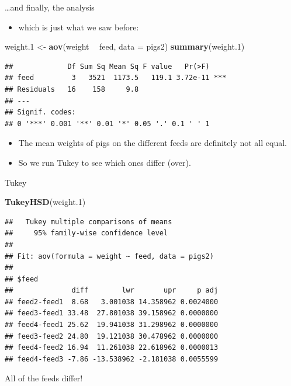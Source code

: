 \documentclass[ignorenonframetext,]{beamer}
\newenvironment{Shaded}{\begin{snugshade}}{\end{snugshade}}
\newcommand{\DataTypeTok}[1]{\textcolor[rgb]{0.13,0.29,0.53}{#1}}
\newcommand{\FloatTok}[1]{\textcolor[rgb]{0.00,0.00,0.81}{#1}}
\newcommand{\KeywordTok}[1]{\textcolor[rgb]{0.13,0.29,0.53}{\textbf{#1}}}
\newcommand{\NormalTok}[1]{#1}
\newcommand{\OperatorTok}[1]{\textcolor[rgb]{0.81,0.36,0.00}{\textbf{#1}}}
\newcommand{\StringTok}[1]{\textcolor[rgb]{0.31,0.60,0.02}{#1}}
\providecommand{\tightlist}{%
  \setlength{\itemsep}{0pt}\setlength{\parskip}{0pt}}
\begin{document}
\begin{frame}[fragile]{\ldots{}and finally, the analysis}
\protect\hypertarget{and-finally-the-analysis}{}

\begin{itemize}
\tightlist
\item
  which is just what we saw before:
\end{itemize}

\begin{Shaded}
\begin{Highlighting}[]
\NormalTok{weight}\FloatTok{.1}\NormalTok{ <-}\StringTok{ }\KeywordTok{aov}\NormalTok{(weight }\OperatorTok{~}\StringTok{ }\NormalTok{feed, }\DataTypeTok{data =}\NormalTok{ pigs2)}
\KeywordTok{summary}\NormalTok{(weight}\FloatTok{.1}\NormalTok{)}
\end{Highlighting}
\end{Shaded}

\begin{verbatim}
##             Df Sum Sq Mean Sq F value   Pr(>F)    
## feed         3   3521  1173.5   119.1 3.72e-11 ***
## Residuals   16    158     9.8                     
## ---
## Signif. codes:  
## 0 '***' 0.001 '**' 0.01 '*' 0.05 '.' 0.1 ' ' 1
\end{verbatim}

\begin{itemize}
\tightlist
\item
  The mean weights of pigs on the different feeds are definitely not all
  equal.
\item
  So we run Tukey to see which ones differ (over).
\end{itemize}

\end{frame}

\begin{frame}[fragile]{Tukey}
\protect\hypertarget{tukey}{}

\begin{Shaded}
\begin{Highlighting}[]
\KeywordTok{TukeyHSD}\NormalTok{(weight}\FloatTok{.1}\NormalTok{)}
\end{Highlighting}
\end{Shaded}

\begin{verbatim}
##   Tukey multiple comparisons of means
##     95% family-wise confidence level
## 
## Fit: aov(formula = weight ~ feed, data = pigs2)
## 
## $feed
##              diff        lwr       upr     p adj
## feed2-feed1  8.68   3.001038 14.358962 0.0024000
## feed3-feed1 33.48  27.801038 39.158962 0.0000000
## feed4-feed1 25.62  19.941038 31.298962 0.0000000
## feed3-feed2 24.80  19.121038 30.478962 0.0000000
## feed4-feed2 16.94  11.261038 22.618962 0.0000013
## feed4-feed3 -7.86 -13.538962 -2.181038 0.0055599
\end{verbatim}

All of the feeds differ!

\end{frame}
\end{document}
